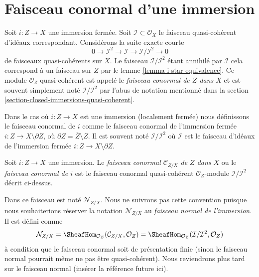 \section{Faisceau conormal d'une immersion}
\label{section-conormal-sheaf}

\noindent
Soit $i : Z \to X$ une immersion fermée.
Soit $\mathcal{I} \subset \mathcal{O}_X$ le faisceau quasi-cohérent d'idéaux correspondant.
Considérons la suite exacte courte
$$
0 \to \mathcal{I}^2 \to \mathcal{I} \to \mathcal{I}/\mathcal{I}^2 \to 0
$$
de faisceaux quasi-cohérents sur $X$. Le faisceau $\mathcal{I}/\mathcal{I}^2$ étant
annihilé par $\mathcal{I}$ cela correspond à un faisceau sur $Z$
par le lemme \ref{lemma-i-star-equivalence}. Ce module $\mathcal{O}_Z$ quasi-cohérent
est appelé le {\it faisceau conormal de
$Z$ dans $X$}
et est souvent simplement noté $\mathcal{I}/\mathcal{I}^2$ par l'abus
de notation mentionné dans la section \ref{section-closed-immersions-quasi-coherent}.

\medskip\noindent
Dans le cas où $i : Z \to X$ est une immersion (localement
fermée) nous définissons le faisceau conormal
de $i$ comme le faisceau conormal
de l'immersion fermée $i : Z \to X \setminus \partial Z$, où $\partial Z = \overline{Z} \setminus Z$.
Il est souvent noté $\mathcal{I}/\mathcal{I}^2$ où $\mathcal{I}$ est le faisceau
d'idéaux de l'immersion fermée $i : Z \to X \setminus \partial Z$.

\begin{definition}
\label{definition-conormal-sheaf}
Soit $i : Z \to X$ une immersion. Le {\it faisceau conormal $\mathcal{C}_{Z/X}$
de $Z$ dans $X$} ou le {\it faisceau conormal
de $i$} est le faisceau conormal quasi-cohérent $\mathcal{O}_Z$-module $\mathcal{I}/\mathcal{I}^2$
décrit ci-dessus.
\end{definition}

\noindent
Dans \cite[IV Définition 16.1.2]{EGA} ce faisceau
est noté $\mathcal{N}_{Z/X}$. Nous ne suivrons pas cette convention puisque nous souhaiterions
réserver la notation $\mathcal{N}_{Z/X}$ au {\it
faisceau normal de l'immersion}. Il est défini comme
$$
\mathcal{N}_{Z/X} =
\SheafHom_{\mathcal{O}_Z}(\mathcal{C}_{Z/X}, \mathcal{O}_Z) =
\SheafHom_{\mathcal{O}_Z}(\mathcal{I}/\mathcal{I}^2, \mathcal{O}_Z)
$$
à condition que le faisceau conormal soit de présentation finie (sinon le faisceau
normal pourrait même ne pas être quasi-cohérent). Nous reviendrons plus tard sur
le faisceau normal (insérer la référence future ici).

